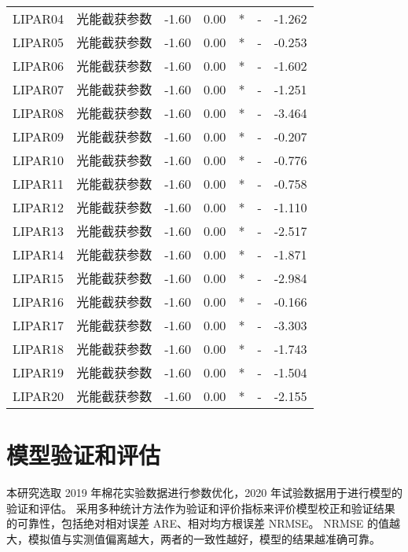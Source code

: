 \begin{longtable}{llrrcrr}
    LIPAR04  & 光能截获参数               & -1.60  & 0.00   & *   & -       & -1.262  \\
    LIPAR05  & 光能截获参数               & -1.60  & 0.00   & *   & -       & -0.253  \\
    LIPAR06  & 光能截获参数               & -1.60  & 0.00   & *   & -       & -1.602  \\
    LIPAR07  & 光能截获参数               & -1.60  & 0.00   & *   & -       & -1.251  \\
    LIPAR08  & 光能截获参数               & -1.60  & 0.00   & *   & -       & -3.464  \\
    LIPAR09  & 光能截获参数               & -1.60  & 0.00   & *   & -       & -0.207  \\
    LIPAR10  & 光能截获参数               & -1.60  & 0.00   & *   & -       & -0.776  \\
    LIPAR11  & 光能截获参数               & -1.60  & 0.00   & *   & -       & -0.758  \\
    LIPAR12  & 光能截获参数               & -1.60  & 0.00   & *   & -       & -1.110  \\
    LIPAR13  & 光能截获参数               & -1.60  & 0.00   & *   & -       & -2.517  \\
    LIPAR14  & 光能截获参数               & -1.60  & 0.00   & *   & -       & -1.871  \\
    LIPAR15  & 光能截获参数               & -1.60  & 0.00   & *   & -       & -2.984  \\
    LIPAR16  & 光能截获参数               & -1.60  & 0.00   & *   & -       & -0.166  \\
    LIPAR17  & 光能截获参数               & -1.60  & 0.00   & *   & -       & -3.303  \\
    LIPAR18  & 光能截获参数               & -1.60  & 0.00   & *   & -       & -1.743  \\
    LIPAR19  & 光能截获参数               & -1.60  & 0.00   & *   & -       & -1.504  \\
    LIPAR20  & 光能截获参数               & -1.60  & 0.00   & *   & -       & -2.155  \\
\end{longtable}

\section{模型验证和评估}

本研究选取 2019 年棉花实验数据进行参数优化，2020 年试验数据用于进行模型的验证和评估。%
采用多种统计方法作为验证和评价指标来评价模型校正和验证结果的可靠性，包括绝对相对误差 ARE、相对均方根误差 NRMSE。%
NRMSE 的值越大，模拟值与实测值偏离越大，两者的一致性越好，模型的结果越准确可靠。


